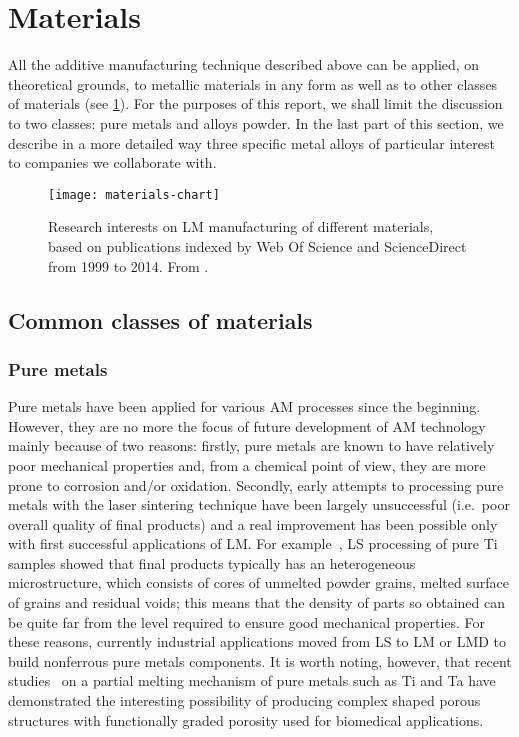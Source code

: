 \section{Materials}
All the additive manufacturing technique described above can be applied, on theoretical grounds, to metallic materials in any form as well as to other classes of materials (see \cref{fig:materials-chart}). For the purposes of this report, we shall limit the discussion to two classes: pure metals and alloys powder. In the last part of this section, we describe in a more detailed way three specific metal alloys of particular interest to companies we collaborate with.
\begin{figure}[bt]
    \centering
    \texttt{[image: materials-chart]}
    \caption{Research interests on LM manufacturing of different materials, based on publications indexed by Web Of Science and ScienceDirect from 1999 to 2014. From \cite{Yap2015}.}
    \label{fig:materials-chart}
\end{figure}

\subsection{Common classes of materials}
\subsubsection{Pure metals}
Pure metals have been applied for various AM processes since the beginning. However, they are no more the focus of future development of AM technology mainly because of two reasons: firstly, pure metals are known to have relatively poor mechanical properties and, from a chemical point of view, they are more prone to corrosion and/or oxidation. Secondly, early attempts to processing pure metals with the laser sintering technique have been largely unsuccessful (i.e.\ poor overall quality of final products) and a real improvement has been possible only with first successful applications of LM. For example~\cite{Fischer2004}, LS processing of pure Ti samples showed that final products typically has an heterogeneous microstructure, which consists of cores of unmelted powder grains, melted surface of grains and residual voids; this means that the density of parts so obtained can be quite far from the level required to ensure good mechanical properties. For these reasons, currently industrial applications moved from LS to LM or LMD to build nonferrous pure metals components. It is worth noting, however, that recent studies~\cites{Krishna2007}{Xue2007} on a partial melting mechanism of pure metals such as Ti and Ta have demonstrated the interesting possibility of producing complex shaped porous structures with functionally graded porosity used for biomedical applications.

